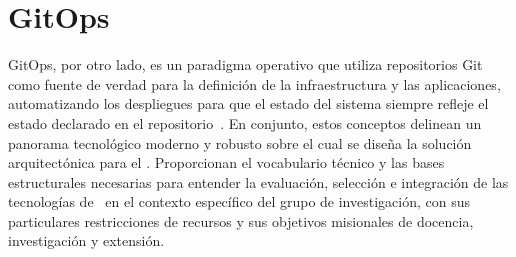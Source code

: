 \section{GitOps}
\noindent
GitOps, por otro lado, es un paradigma operativo que utiliza repositorios Git como fuente de verdad para la definición de la infraestructura y las aplicaciones, automatizando los despliegues para que el estado del sistema siempre refleje el estado declarado en el repositorio~\citep{kormanik2023exploring}. En conjunto, estos conceptos delinean un panorama tecnológico moderno y robusto sobre el cual se diseña la solución arquitectónica para el \GRID. Proporcionan el vocabulario técnico y las bases estructurales necesarias para entender la evaluación, selección e integración de las tecnologías de \VBC\ en el contexto específico del grupo de investigación, con sus particulares restricciones de recursos y sus objetivos misionales de docencia, investigación y extensión.


